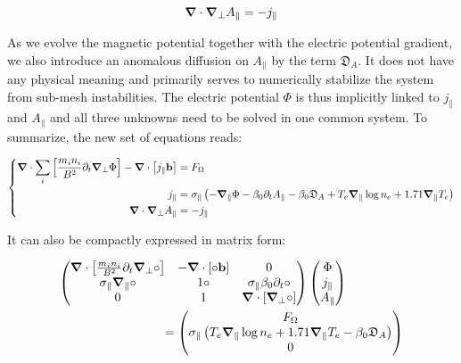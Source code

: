 \begin{equation}
	\label{eq:S3X_AmpereLaw}
	\grad\cdot\grad_\perp A_\parallel = -j_\parallel
\end{equation}

As we evolve the magnetic potential together with the electric potential gradient, we also introduce an anomalous diffusion on $A_\parallel$ by the term $\mathfrak{D}_A$. It does not have any physical meaning and primarily serves to numerically stabilize the system from sub-mesh instabilities. The electric potential $\Phi$ is thus implicitly linked to $j_\parallel$ and $A_\parallel$ and all three unknowns need to be solved in one common system. To summarize, the new set of equations reads:

\begin{align}
	\label{eq:S3X_vorticityEquation_MagneticInduction}
		\left\{
	\begin{aligned}
		\grad\cdot\sum_{i}\left[\frac{m_i n_i}{ B^2}\partial_t\grad_\perp\Phi\right] - \grad\cdot\left[j_\parallel\mathbf{b}\right]& = F_\Omega \\
		j_\parallel& = \sigma_\parallel \left(-\grad_\parallel\Phi - \beta_0\partial_t A_\parallel - \beta_0\mathfrak{D}_A + T_e\grad_\parallel\log n_e + 1.71\grad_\parallel T_e \right) \\
		\grad\cdot\grad_\perp A_\parallel& = -j_\parallel
	\end{aligned}
	\right.
\end{align}

It can also be compactly expressed in matrix form: 

\begin{align}
	\makebox[0.8\textwidth][l]{$\displaystyle
		\begin{pmatrix}
			\grad\cdot\left[\frac{m_i n_i}{ B^2}\partial_t\grad_\perp\circ\right] & 
			- \grad\cdot\left[\circ\mathbf{b}\right] & 
			0 \\
			\sigma_\parallel\grad_\parallel\circ &
			1 \circ &
			\sigma_\parallel\beta_0\partial_t\circ \\
			0 & 1 & \grad\cdot\left[\grad_\perp\circ\right]
		\end{pmatrix}
		\begin{pmatrix}
			\Phi \\ j_\parallel \\ A_\parallel
		\end{pmatrix}
		$} \nonumber \\	
	\makebox[0.8\textwidth][r]{$\displaystyle
		=\begin{pmatrix}
			F_\Omega \\
			\sigma_\parallel\left(T_e\grad_\parallel\log n_e + 1.71\grad_\parallel T_e - \beta_0\mathfrak{D}_A \right) \\
			0
		\end{pmatrix}
		$} \label{eq:S3X_vorticityEquation_Electromagnetism_matrix}
\end{align}



